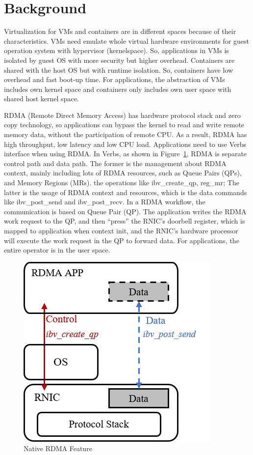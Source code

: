 \section{Background}

Virtualization for VMs and containers are in different spaces because of their characteristics. VMs need emulate whole virtual hardware environments for guest operation system with hypervisor (kernelspace). So, applications in VMs is isolated by guest OS with more security but higher overhead. Containers are shared with the host OS but with runtime isolation. So, containers have low overhead and fast boot-up time. For applications, the abstraction of VMs includes own kernel space and containers only includes own user space with shared host kernel space.


RDMA (Remote Direct Memory Access) has hardware protocol stack and zero copy technology, so applications can bypass the kernel to read and write remote memory data, without the participation of remote CPU. As a result, RDMA has high throughput, low latency and low CPU load. Applications need to use Verbs interface when using RDMA. In Verbs, as shown in Figure~\ref{fig:rdma-feat}, RDMA is separate control path and data path. The former is the management about RDMA context, mainly including lots of RDMA resources, such as Queue Pairs (QPs), and Memory Regions (MRs). the operations like ibv\_create\_qp, reg\_mr; The latter is the usage of RDMA context and resources, which is the data commands like ibv\_post\_send and ibv\_post\_recv. In a RDMA workflow, the communication is based on Queue Pair (QP). The application writes the RDMA work request to the QP, and then ``press''  the RNIC's doorbell register, which is mapped to application when context init, and the RNIC's hardware processor will execute the work request in the QP to forward data. For applications, the entire operator is in the user space.

\begin{figure}[!ht]
	\centering
	\includegraphics[width=0.6\linewidth]{images/rdma-feat}
	\caption{Native RDMA Feature}
	\label{fig:rdma-feat}
\end{figure}


